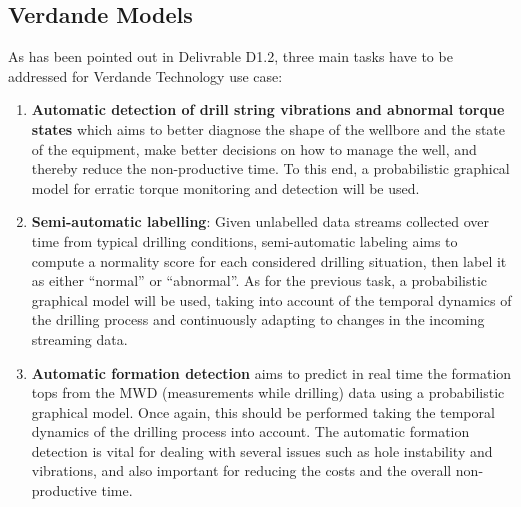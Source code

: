\subsection{Verdande Models}
\label{Section:VerdandeModels}



As has been pointed out in Delivrable D1.2, three main tasks have to be addressed for Verdande Technology use case:

\begin{enumerate}

\item \textbf{Automatic detection of drill string vibrations and abnormal torque states} which aims to better diagnose the shape of the wellbore and the state of the equipment, make better decisions on how to manage the well, and thereby reduce the non-productive time. To this end, a probabilistic graphical model for erratic torque monitoring and detection will be used.


\item \textbf{Semi-automatic labelling}: Given unlabelled data streams collected over time from typical drilling conditions, semi-automatic labeling aims to compute a normality score for each considered drilling situation, then label it as either ``normal'' or ``abnormal''. As for the previous task, a probabilistic graphical model will be used, taking into account of the temporal dynamics of the drilling process and continuously adapting to changes in the incoming streaming data. %

\item \textbf{Automatic formation detection} aims to predict in real time the formation tops from the MWD (measurements while drilling) data using a probabilistic graphical model. Once again, this should be performed taking the temporal dynamics of the drilling process 
into account. The automatic formation detection is vital for dealing with several issues such as hole instability and vibrations, and also important for reducing the costs and the overall non-productive time.
\end{enumerate}

